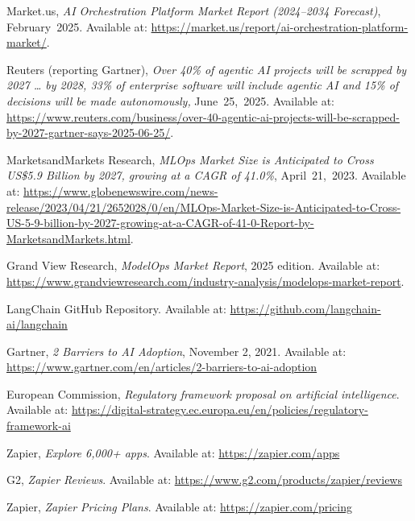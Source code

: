 \documentclass[11pt, a4paper, oneside]{article}
\begin{document}
\begin{thebibliography}{99}

    Market.us, \textit{AI Orchestration Platform Market Report (2024--2034 Forecast)}, February~2025.  
    Available at: \url{https://market.us/report/ai-orchestration-platform-market/}.
    
    Reuters (reporting Gartner), \textit{Over 40\% of agentic AI projects will be scrapped by 2027 … by 2028, 33\% of enterprise software will include agentic AI and 15\% of decisions will be made autonomously,} June~25,~2025.
    Available at: \url{https://www.reuters.com/business/over-40-agentic-ai-projects-will-be-scrapped-by-2027-gartner-says-2025-06-25/}.

    MarketsandMarkets Research, \textit{MLOps Market Size is Anticipated to Cross US\$5.9 Billion by 2027, growing at a CAGR of 41.0\%}, April~21,~2023.
    Available at: \url{https://www.globenewswire.com/news-release/2023/04/21/2652028/0/en/MLOps-Market-Size-is-Anticipated-to-Cross-US-5-9-billion-by-2027-growing-at-a-CAGR-of-41-0-Report-by-MarketsandMarkets.html}.

    Grand View Research, \textit{ModelOps Market Report}, 2025 edition.  
    Available at: \url{https://www.grandviewresearch.com/industry-analysis/modelops-market-report}.
    
    LangChain GitHub Repository.
    Available at: \url{https://github.com/langchain-ai/langchain}

    Gartner, \textit{2 Barriers to AI Adoption}, November 2, 2021. Available at: \url{https://www.gartner.com/en/articles/2-barriers-to-ai-adoption}

    European Commission, \textit{Regulatory framework proposal on artificial intelligence}.
    Available at: \url{https://digital-strategy.ec.europa.eu/en/policies/regulatory-framework-ai}
    
    Zapier, \textit{Explore 6,000+ apps}.
    Available at: \url{https://zapier.com/apps}

    G2, \textit{Zapier Reviews}.
    Available at: \url{https://www.g2.com/products/zapier/reviews}

    Zapier, \textit{Zapier Pricing Plans}.
    Available at: \url{https://zapier.com/pricing}


\end{thebibliography}
\end{document}

